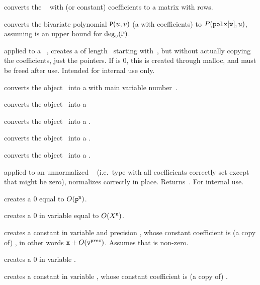 converts the ~ with
 (or constant) coefficients to a matrix with  rows.

 converts the bivariate polynomial
${\tt P}(u,v)$ (a  with  coefficients) to
$P({\tt polx[w]},u)$, assuming  is an upper bound for
$\deg_v({\tt P})$.

 applied to a
~, creates a  of length~ starting
with~, but without actually copying the coefficients, just the
pointers. If  is $0$, this is created through malloc, and
must be freed after use. Intended for internal use only.

 converts the object~ into a 
with main variable number~.

 converts the object~ into a 

 converts the object~ into a .

 converts the object~ into a .

 converts the object~ into a
.

 applied to an unnormalized ~
(i.e.~type  with all coefficients correctly set except that 
might be zero), normalizes  correctly in place. Returns~.
For internal use.

\label{se:clean}

 creates a $0$  equal to
$O({\tt p}^{\tt n})$.

 creates a $0$  in variable
 equal to $O(X^{\tt n})$.

 creates a constant 
in variable  and precision , whose constant coefficient is
(a copy of) , in other words ${\tt x} + O({\tt v}^{\tt prec})$.
Assumes that  is non-zero.

 creates a $0$  in variable .

 creates a constant  in variable
, whose constant coefficient is (a copy of) .


